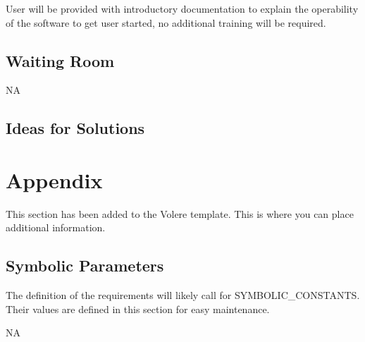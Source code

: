 \documentclass[12pt, titlepage]{article}
\begin{document}
User will be provided with introductory documentation to explain the operability of the software to get user started, no additional training will be required. 

\subsection{Waiting Room}

NA

\subsection{Ideas for Solutions}





\newpage

\section{Appendix}

This section has been added to the Volere template.  This is where you can place
additional information.

\subsection{Symbolic Parameters}

The definition of the requirements will likely call for SYMBOLIC\_CONSTANTS.
Their values are defined in this section for easy maintenance.

NA 
\end{document}
